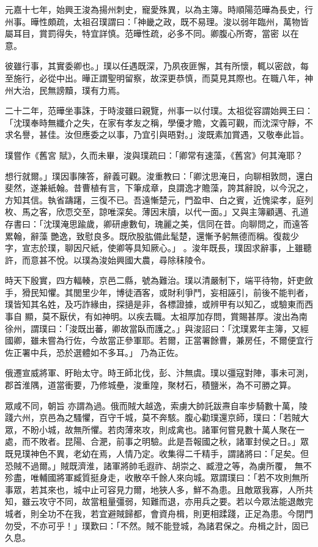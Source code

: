 \begin{pinyinscope}
 元嘉十七年，始興王浚為揚州刺史，寵愛殊異，以為主簿。時順陽范曄為長史，行州事。曄性頗疏，太祖召璞謂曰：「神畿之政，既不易理。浚以弱年臨州，萬物皆屬耳目，賞罰得失，特宜詳慎。范曄性疏，必多不同。卿腹心所寄，當密
 以在意。



 彼雖行事，其實委卿也。」璞以任遇既深，乃夙夜匪懈，其有所懷，輒以密啟，每至施行，必從中出。曄正謂聖明留察，故深更恭慎，而莫見其際也。在職八年，神州大治，民無謗黷，璞有力焉。



 二十二年，范曄坐事誅，于時浚雖曰親覽，州事一以付璞。太祖從容謂始興王曰：「沈璞奉時無纖介之失，在家有孝友之稱，學優才贍，文義可觀，而沈深守靜，不求名譽，甚佳。汝但應委之以事，乃宜引與晤對。」浚既素加賞遇，又敬奉此旨。



 璞嘗作《舊宮
 賦》，久而未畢，浚與璞疏曰：「卿常有速藻，《舊宮》何其淹耶？


想行就爾。」璞因事陳答，辭義可觀。浚重教曰：「卿沈思淹日，向聊相敦問，還白斐然，遂兼紙翰。昔曹植有言，下筆成章，良謂逸才贍藻，誇其辭說，以今況之，方知其信。執省躊躇，三復不已。吾遠慚楚元，門盈申、白之賓，近愧梁孝，庭列枚、馬之客，欣恧交至，諒唯深矣。薄因末牘，以代一面。」又與主簿顧邁、孔道存書曰：「沈璞淹思踰歲，卿研慮數旬，瑰麗之美，信同在昔。向聊問之，而遠答累翰，辭藻
 艷逸，致慰良多。既欣股肱備此髦楚，還慚予躬無德而稱。復裁少字，宣志於璞，聊因尺紙，使卿等具知厥心。」
 。浚年既長，璞固求辭事，上雖聽許，而意甚不悅。以璞為浚始興國大農，尋除秣陵令。


時天下殷實，四方輻輳，京邑二縣，號為難治。璞以清嚴制下，端平待物，奸吏斂手，猾民知懼。其閭里少年，博徒酒客，或財利爭鬥，妄相誣引，前後不能判者，璞皆知其名姓，及巧詐緣由，探擿是非，各標證據，或辨甲有以知乙，或驗東而西事自
 顯，莫不厭伏，有如神明。以疾去職。太祖厚加存問，賞賜甚厚。浚出為南徐州，謂璞曰：「浚既出蕃，卿故當臥而護之。」與浚詔曰：「沈璞累年主簿，又經國卿，雖未嘗為行佐，今故當正參軍耶。若爾，正當署餘曹，兼房任，不爾便宜行佐正署中兵，恐於選體如不多耳。」
 乃為正佐。



 俄遷宣威將軍、盱眙太守。時王師北伐，彭、汴無虞。璞以彊寇對陣，事未可測，郡首淮隅，道當衝要，乃修城壘，浚重隍，聚材石，積鹽米，為不可勝之算。



 眾咸不同，朝旨
 亦謂為過。俄而賊大越逸，索虜大帥託跋燾自率步騎數十萬，陵踐六州，京邑為之騷懼，百守千城，莫不奔駭。腹心勸璞還京師，璞曰：「若賊大眾，不盼小城，故無所懼。若肉薄來攻，則成禽也。諸軍何嘗見數十萬人聚在一處，而不敗者。昆陽、合淝，前事之明驗。此是吾報國之秋，諸軍封侯之日。」眾既見璞神色不異，老幼在焉，人情乃定。收集得二千精手，謂諸將曰：「足矣。但恐賊不過爾。」賊既濟淮，諸軍將帥毛遐祚、胡崇之、臧澄之等，為虜所覆，
 無不殄盡，唯輔國將軍臧質挺身走，收散卒千餘人來向城。眾謂璞曰：「若不攻則無所事眾，若其來也，城中止可容見力爾，地狹人多，鮮不為患。且敵眾我寡，人所共知，雖云攻守不同，故當粗量彊弱，知難而退，亦用兵之要。若以今眾法能退敵完城者，則全功不在我，若宜避賊歸都，會資舟楫，則更相蹂踐，正足為患。今閉門勿受，不亦可乎！」璞歎曰：「不然。賊不能登城，為諸君保之。舟楫之計，固已久息。




\end{pinyinscope}
